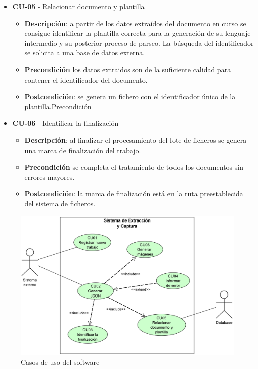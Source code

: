 \begin{itemize}
\item \textbf{CU-05} - Relacionar documento y plantilla
	\begin{itemize}
		\item \textbf{Descripción}: a partir de los datos extraídos del documento en curso se consigue identificar la plantilla correcta para la generación de su lenguaje intermedio y su posterior proceso de parseo. La búsqueda del identificador se solicita a una base de datos externa.
		\item \textbf{Precondición} los datos extraidos son de la suficiente calidad para contener el identificador del documento.
		\item \textbf{Postcondición}: se genera un fichero con el identificador único de la plantilla.Precondición
\end{itemize}
\item \textbf{CU-06} - Identificar la finalización
	\begin{itemize}
		\item \textbf{Descripción}: al finalizar el procesamiento del lote de ficheros se genera una marca de finalización del trabajo.
		\item \textbf{Precondición} se completa el tratamiento de todos los documentos sin errores mayores.
		\item \textbf{Postcondición}: la marca de finalización está en la ruta preestablecida del sistema de ficheros.
\end{itemize}

\end{itemize}

\begin{figure}[hp!]
	\centering
	\includegraphics[width=1.0\textwidth]{imaxes/g-analisis/casos-uso.png}
	\caption{Casos de uso del software}
	\label{fig:casos-de-uso}
\end{figure}

